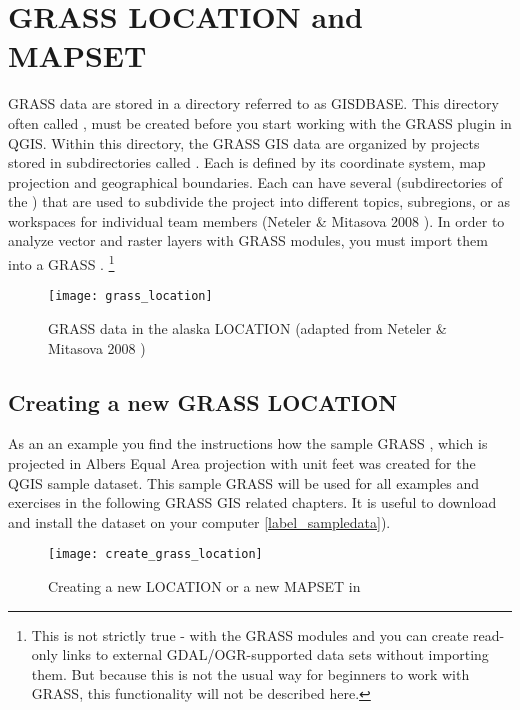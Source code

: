 \section{GRASS LOCATION and MAPSET}\label{sec:about_loc}

GRASS data are stored in a directory referred to as GISDBASE. This directory 
often called , must be created before you start working 
with the GRASS plugin in QGIS. Within this directory, the GRASS GIS data 
are organized by projects stored in subdirectories called . 
Each  is defined by its coordinate system, map projection 
and geographical boundaries. Each  can have several 
 (subdirectories of the ) that are used 
to subdivide the project into different topics, subregions, or as workspaces 
for individual team members (Neteler \& Mitasova 2008 
\cite{neteler_mitasova08}). In order to analyze vector and raster layers with 
GRASS modules, you must import them into a GRASS .
\footnote{This is not strictly true - with the GRASS modules 
 and  you can create read-only links 
to external GDAL/OGR-supported data sets without importing them. But because 
this is not the usual way for beginners to work with GRASS, this functionality 
will not be described here.}

\begin{figure}[ht]
\centering
\texttt{[image: grass\_location]}
\caption{GRASS data in the alaska LOCATION (adapted from Neteler \& Mitasova 2008 \cite{neteler_mitasova08})}\label{fig:grass_location}\end{figure}

\subsection{Creating a new GRASS LOCATION}\label{sec:create_loc}

As an an example you find the instructions how the sample GRASS
, which is projected in Albers Equal Area
projection with unit feet was created for the QGIS sample dataset. This
sample GRASS  will be used for all examples and
exercises in the following GRASS GIS related chapters. It is useful to
download and install the dataset on your computer \ref{label_sampledata}).

\begin{figure}[ht]
\centering
\texttt{[image: create\_grass\_location]}
\caption{Creating a new \grass LOCATION or a new MAPSET in \qg \nixcaption}
\label{fig:create_grass_location}
\end{figure}

